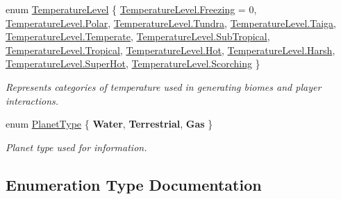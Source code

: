 \begin{DoxyCompactItemize}
\item 
enum \hyperlink{namespace_midnight_blue_a6ea6484178cbe707f25d1a0ed56db7ab}{Temperature\+Level} \{ \newline
\hyperlink{namespace_midnight_blue_a6ea6484178cbe707f25d1a0ed56db7aba64a54c31b5b440b2f5a00a723df03ec4}{Temperature\+Level.\+Freezing} = 0, 
\hyperlink{namespace_midnight_blue_a6ea6484178cbe707f25d1a0ed56db7abae266cfd65ad46a67fc54b0efd38e40dd}{Temperature\+Level.\+Polar}, 
\hyperlink{namespace_midnight_blue_a6ea6484178cbe707f25d1a0ed56db7abac63e2bf2eb1c92832e0a76fb3734abe8}{Temperature\+Level.\+Tundra}, 
\hyperlink{namespace_midnight_blue_a6ea6484178cbe707f25d1a0ed56db7aba32864c09ef538453b4d8110734ee355b}{Temperature\+Level.\+Taiga}, 
\newline
\hyperlink{namespace_midnight_blue_a6ea6484178cbe707f25d1a0ed56db7abae83280629ee0ad3886e8921fb8927ced}{Temperature\+Level.\+Temperate}, 
\hyperlink{namespace_midnight_blue_a6ea6484178cbe707f25d1a0ed56db7abaee38ff3caffad90ba40d7fd7ce41c9ae}{Temperature\+Level.\+Sub\+Tropical}, 
\hyperlink{namespace_midnight_blue_a6ea6484178cbe707f25d1a0ed56db7aba4616594df26c58d9dbed290898452f67}{Temperature\+Level.\+Tropical}, 
\hyperlink{namespace_midnight_blue_a6ea6484178cbe707f25d1a0ed56db7aba4194726ee334e1085d93e002837b73f0}{Temperature\+Level.\+Hot}, 
\newline
\hyperlink{namespace_midnight_blue_a6ea6484178cbe707f25d1a0ed56db7abad6b8294df3871e4689e0f4964b4a1219}{Temperature\+Level.\+Harsh}, 
\hyperlink{namespace_midnight_blue_a6ea6484178cbe707f25d1a0ed56db7aba804a73886e309aa19afbc92553edd52a}{Temperature\+Level.\+Super\+Hot}, 
\hyperlink{namespace_midnight_blue_a6ea6484178cbe707f25d1a0ed56db7aba35b2d04e25785c4ddff96c0caf345681}{Temperature\+Level.\+Scorching}
 \}\begin{DoxyCompactList}\small\item\em Represents categories of temperature used in generating biomes and player interactions. \end{DoxyCompactList}
\item 
enum \hyperlink{namespace_midnight_blue_a4a799009a18b57979628708589ae53e3}{Planet\+Type} \{ {\bfseries Water}, 
{\bfseries Terrestrial}, 
{\bfseries Gas}
 \}\begin{DoxyCompactList}\small\item\em Planet type used for information. \end{DoxyCompactList}
\end{DoxyCompactItemize}


\subsection{Enumeration Type Documentation}
\hypertarget{namespace_midnight_blue_a8a6ba5637b64c3eb991f00d48decf381}{}\label{namespace_midnight_blue_a8a6ba5637b64c3eb991f00d48decf381} 
